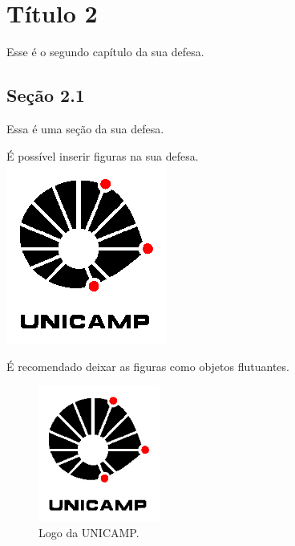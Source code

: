 \chapter{Título 2}
Esse é o segundo capítulo da sua defesa.

\section{Seção 2.1}
Essa é uma seção da sua defesa.

É possível inserir figuras na sua defesa. \\
\includegraphics{figuras/unicamp-logo.jpg}

É recomendado deixar as figuras como objetos flutuantes.
\begin{figure}[!htb]
    \center
    \includegraphics[width=4cm]{figuras/unicamp-logo.jpg}
    \caption{Logo da UNICAMP.}
    \label{fig:log_unicamp}
\end{figure}

